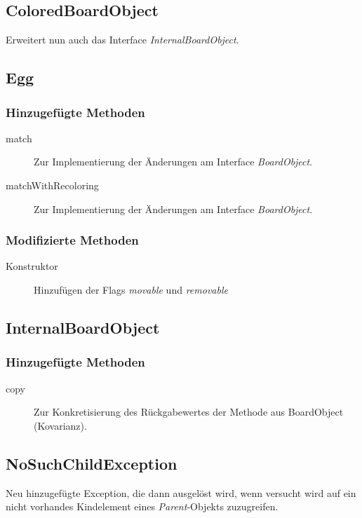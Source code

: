 \subsection{ColoredBoardObject}
Erweitert nun auch das Interface \emph{InternalBoardObject}.


\subsection{Egg}

\subsubsection{Hinzugefügte Methoden}
\begin{description}
\item[match]
Zur Implementierung der Änderungen am Interface \emph{BoardObject}.
\item[matchWithRecoloring]
Zur Implementierung der Änderungen am Interface \emph{BoardObject}.
\end{description}

\subsubsection{Modifizierte Methoden}
\begin{description}
\item[Konstruktor]
Hinzufügen der Flags \emph{movable} und \emph{removable}
\end{description}


\subsection{InternalBoardObject}

\subsubsection{Hinzugefügte Methoden}
\begin{description}
\item[copy]
Zur Konkretisierung des Rückgabewertes der Methode aus BoardObject (Kovarianz).
\end{description}


\subsection{NoSuchChildException}
Neu hinzugefügte Exception, die dann ausgelöst wird, wenn versucht wird auf ein nicht vorhandes Kindelement eines \emph{Parent}-Objekts zuzugreifen.


